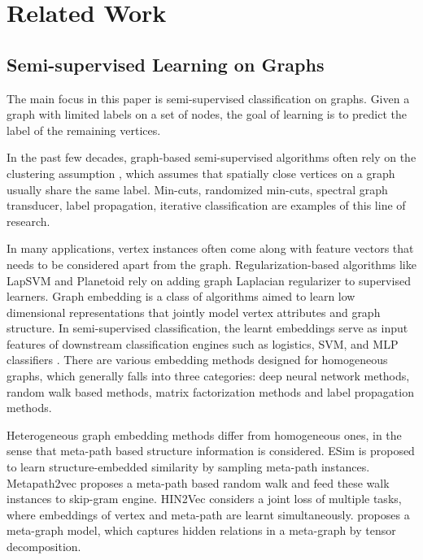 \section{Related Work}
\label{sec:related}
\subsection{Semi-supervised Learning on Graphs}
The main focus in this paper is semi-supervised classification on graphs. Given a graph with limited labels on a set of nodes, the goal of learning is to predict the label of the remaining vertices. 

In the past few decades, graph-based semi-supervised algorithms often rely on the clustering assumption \citep{ChapelleZ05}, which assumes that spatially close vertices on a graph usually share the same label. Min-cuts, randomized min-cuts, spectral graph transducer, label propagation, iterative classification are examples of this line of research.

In many applications, vertex instances often come along with feature vectors that needs to be considered apart from the graph. Regularization-based algorithms like LapSVM \citep{BelkinNS06} and Planetoid \citep{YangCS16} rely on adding graph Laplacian regularizer to supervised learners.
Graph embedding is a class of algorithms aimed to learn low dimensional representations that jointly model vertex attributes and graph structure. In semi-supervised classification, the learnt embeddings serve as input features of downstream classification engines such as logistics, SVM, and MLP classifiers . There are various embedding methods designed for homogeneous graphs, which generally falls into three categories: deep neural network methods\cite{WangC016}, random walk based methods\cite{GroverL16,PerozziAS14}, matrix factorization methods and label propagation methods.

Heterogeneous graph embedding methods differ from homogeneous ones, in the sense that meta-path based structure information is considered. 
ESim\citep{ShangQLKHP16} is proposed to learn structure-embedded similarity by sampling meta-path instances.  
Metapath2vec \cite{DongCS17} proposes a meta-path based random walk and feed these walk instances to skip-gram engine.
HIN2Vec \cite{FuLL17} considers a joint loss of multiple tasks, where embeddings of vertex and meta-path are learnt simultaneously.
\citet{Sun00CXWY18} proposes a meta-graph model, which captures hidden relations in a meta-graph by tensor decomposition.

